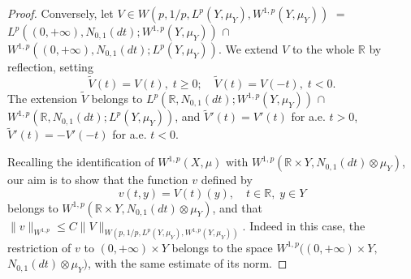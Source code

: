\documentclass[reqno,twoside,12pt]{amsart}
\begin{document}
\begin{proof}
Conversely, let $V\in W(p, 1/p,  L^p(Y, \mu_Y),W^{1,p}(Y, \mu_Y))$ $=$  $L^p((0, +\infty),  N_{0,1}(dt);W^{1,p}(Y, \mu_Y))$ $\cap$ $W^{1,p}  ((0, +\infty), N_{0,1}(dt);L^p(Y, \mu_Y))$. We extend $V$ to the whole ${\mathbb R} $ by reflection, setting
$$\widetilde{V}(t) = V(t), \;t\geq 0; \quad \widetilde{V}(t) = V(-t), \;t<0.$$
The extension $\widetilde{V}$ belongs to $L^p({\mathbb R},  N_{0,1}(dt);W^{1,p}(Y, \mu_Y))$ $\cap$ $W^{1,p}  ({\mathbb R}, N_{0,1}(dt);L^p(Y, \mu_Y))$, and   $\widetilde{V}'(t) = V'(t)$ for a.e. $t>0$, $\widetilde{V}'(t) = -V'(-t)$ for a.e. $t<0$. 

Recalling the identification of $W^{1,p}(X, \mu)$ with 
$W^{1,p}({\mathbb R} \times Y,N_{0,1}(dt) \otimes  \mu_Y)$, our aim is to show that the function $v$ defined by 
$$v(t,y) = V(t)(y), \quad t\in {\mathbb R}, \;y\in Y$$
belongs to $W^{1,p}({\mathbb R} \times Y,N_{0,1}(dt) \otimes  \mu_Y)$, and that $\|v\|_{W^{1,p}}\leq C\|V\|_{W(p, 1/p,  L^p(Y, \mu_Y),W^{1,p}(Y, \mu_Y))}$. Indeed in this case, the restriction of $v$ to $(0, +\infty)\times Y$ belongs to the space 
$W^{1,p}((0, +\infty)\times Y,$ $N_{0,1}(dt) \otimes  \mu_Y)$, with the same estimate of its norm. 


\end{proof}
\end{document}
